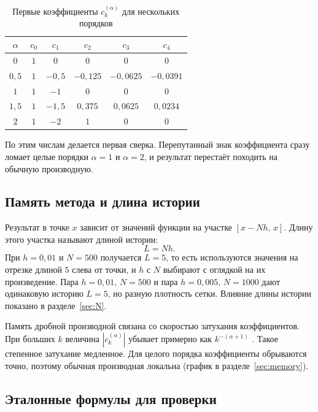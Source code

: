 \documentclass[14pt,a4paper]{extarticle}
\begin{document}
\begin{table}[htbp]
\centering
\caption{Первые коэффициенты $c_k^{(\alpha)}$ для нескольких порядков}
\label{tab:coeffs}
\begin{tabular}{|c|c|c|c|c|c|}
\hline
$\alpha$ & $c_0$ & $c_1$ & $c_2$ & $c_3$ & $c_4$ \\
\hline
$0$    & $1$ & $0$    & $0$      & $0$      & $0$ \\
\hline
$0{,}5$& $1$ & $-0{,}5$ & $-0{,}125$ & $-0{,}0625$ & $-0{,}0391$ \\
\hline
$1$    & $1$ & $-1$   & $0$      & $0$      & $0$ \\
\hline
$1{,}5$& $1$ & $-1{,}5$ & $0{,}375$  & $0{,}0625$  & $0{,}0234$ \\
\hline
$2$    & $1$ & $-2$   & $1$      & $0$      & $0$ \\
\hline
\end{tabular}
\end{table}

По этим числам делается первая сверка. Перепутанный знак коэффициента сразу ломает целые порядки $\alpha=1$ и $\alpha=2$, и результат перестаёт походить на обычную производную.

\subsection{Память метода и длина истории}

Результат в точке $x$ зависит от значений функции на участке $[x-Nh,\,x]$. Длину этого участка называют длиной истории:
\begin{equation}
L=Nh.
\end{equation}
При $h=0{,}01$ и $N=500$ получается $L=5$, то есть используются значения на отрезке длиной $5$ слева от точки, и $h$ с $N$ выбирают с оглядкой на их произведение. Пара $h=0{,}01,\,N=500$ и пара $h=0{,}005,\,N=1000$ дают одинаковую историю $L=5$, но разную плотность сетки. Влияние длины истории показано в разделе~\ref{sec:N}.

Память дробной производной связана со скоростью затухания коэффициентов. При больших $k$ величина $|c_k^{(\alpha)}|$ убывает примерно как $k^{-(\alpha+1)}$ \cite{podlubny}. Такое степенное затухание медленное. Для целого порядка коэффициенты обрываются точно, поэтому обычная производная локальна (график в разделе~\ref{sec:memory}).

\subsection{Эталонные формулы для проверки}
\end{document}
